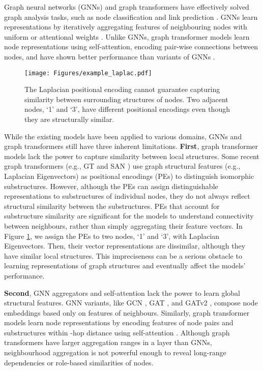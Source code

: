 \documentclass[oneside]{article}
\begin{document}
Graph neural networks (GNNs) and graph transformers have effectively solved graph analysis tasks, such as node classification and link prediction \cite{DBLP:journals/corr/KipfW16, dwivedi2020generalization, s23084168}.
GNNs learn representations by iteratively aggregating features of neighbouring nodes with uniform or attentional weights \cite{DBLP:journals/corr/KipfW16,DBLP:journals/sensors/JeonCL22}.
Unlike GNNs, graph transformer models learn node representations using self-attention, encoding pair-wise connections between nodes, and have shown better performance than variants of GNNs \cite{dwivedi2020generalization}.


\begin{figure}[t]
\centering 
  \texttt{[image: Figures/example\_laplac.pdf]}
  \caption{
The Laplacian positional encoding cannot guarantee capturing similarity between surrounding structures of nodes.
 Two adjacent nodes, `1' and `3', have different positional encodings even though they are structurally similar.
  }
  \label{fig:example_laplac}
\end{figure}



While the existing models have been applied to various domains, GNNs and graph transformers still have three inherent limitations.
\textbf{{First}}, graph transformer models lack the power to capture similarity between local structures.
Some recent graph transformers (e.g., GT \cite{dwivedi2020generalization} and SAN \cite{DBLP:conf/nips/KreuzerBHLT21}) use graph structural features (e.g., Laplacian Eigenvectors) as positional encodings (PEs) to distinguish isomorphic substructures.
However, although the PEs can assign distinguishable representations to substructures of individual nodes, they do not always reflect structural similarity between the substructures.
PEs that account for substructure similarity are significant for the models to understand connectivity between neighbours, rather than simply aggregating their feature vectors. 
In Figure \ref{fig:example_laplac}, we assign the PEs to two nodes, `1' and `3', with Laplacian Eigenvectors.
Then, their vector representations are dissimilar, although they have similar local structures.
This impreciseness can be a serious obstacle to learning representations of graph structures and eventually affect the models' performance.

\textbf{{Second}}, GNN aggregators and self-attention lack the power to learn global structural features.
GNN variants, like GCN \cite{DBLP:journals/corr/KipfW16}, GAT  \cite{velivckovic2017graph}, and GATv2 \cite{DBLP:journals/corr/abs-2105-14491,Lee2020,lee2020learning}, compose node embeddings based only on features of neighbours. 
Similarly, graph transformer models learn node representations by encoding features of node pairs and substructures within -hop distance using self-attention \cite{DBLP:conf/icml/ChenOB22,lee2020story,jeon2021learning}.
Although graph transformers have larger aggregation ranges in a layer than GNNs, neighbourhood aggregation is not powerful enough to reveal long-range dependencies or role-based similarities of nodes. 
\end{document}
